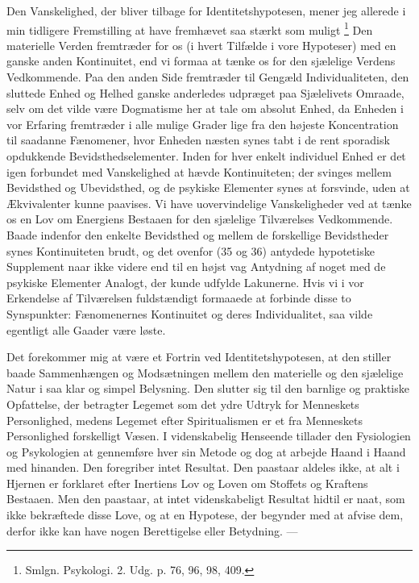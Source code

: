 \documentclass[12pt,a4paper,openany]{book}
\newcommand{\opage}[1]{\marginnote{\footnotesize\textit{[#1]}}}
\begin{document}
Den Vanskelighed, der bliver tilbage for Identitetshypotesen, mener jeg
allerede i min tidligere Fremstilling at have fremhævet saa stærkt som muligt%
\footnote[1]{Smlgn. Psykologi. 2. Udg. p. 76, 96, 98, 409.} Den materielle
Verden fremtræder for os (i hvert Tilfælde i vore Hypoteser) med en ganske
anden Kontinuitet, end vi formaa at tænke os for den sjælelige Verdens
Vedkommende. Paa den anden Side fremtræder til Gengæld Individualiteten, den
sluttede Enhed og Helhed ganske anderledes udpræget paa Sjælelivets Omraade,
selv om det vilde være Dogmatisme her at tale om absolut Enhed, da Enheden i
vor Erfaring fremtræder i alle mulige Grader lige fra den højeste Koncentration
til saadanne Fænomener, hvor Enheden næsten synes tabt i de rent sporadisk
opdukkende Bevidsthedselementer. Inden for hver enkelt individuel Enhed er det
igen forbundet med Vanskelighed at hævde Kontinuiteten; der svinges mellem
\setcounter{footnote}{0}%
\opage{91}Bevidsthed og Ubevidsthed, og de psykiske Elementer synes at
forsvinde, uden at Ækvivalenter kunne paavises. Vi have uovervindelige
Vanskeligheder ved at tænke os en Lov om Energiens Bestaaen for den sjælelige
Tilværelses Vedkommende. Baade indenfor den enkelte Bevidsthed og mellem de
forskellige Bevidstheder synes Kontinuiteten brudt, og det ovenfor (35 og 36)
antydede hypotetiske Supplement naar ikke videre end til en højst vag Antydning
af noget med de psykiske Elementer Analogt, der kunde udfylde Lakunerne. Hvis
vi i vor Erkendelse af Tilværelsen fuldstændigt formaaede at forbinde disse to
Synspunkter: Fænomenernes Kontinuitet og deres Individualitet, saa vilde
egentligt alle Gaader være løste.

Det forekommer mig at være et Fortrin ved Identitetshypotesen, at den stiller
baade Sammenhængen og Modsætningen mellem den materielle og den sjælelige Natur
i saa klar og simpel Belysning. Den slutter sig til den barnlige og praktiske
Opfattelse, der betragter Legemet som det ydre Udtryk for Menneskets
Personlighed, medens Legemet efter Spiritualismen er et fra Menneskets
Personlighed forskelligt Væsen. I videnskabelig Henseende tillader den
Fysiologien og Psykologien at gennemføre hver sin Metode og dog at arbejde
Haand i Haand med hinanden. Den foregriber intet Resultat. Den paastaar aldeles
ikke, at alt i Hjernen er forklaret efter Inertiens Lov og Loven om Stoffets og
Kraftens Bestaaen. Men den paastaar, at intet videnskabeligt Resultat hidtil er
naat, som ikke bekræftede disse Love, og at en Hypotese, der begynder med at
afvise dem, derfor ikke kan have nogen Berettigelse eller Betydning. ---
\end{document}
